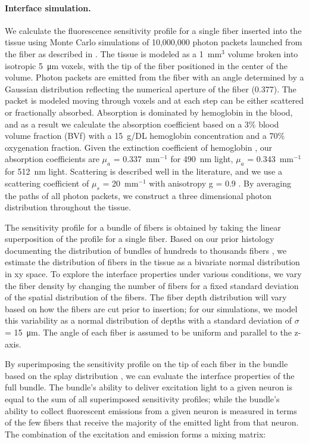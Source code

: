 \paragraph{Interface simulation.} We calculate the fluorescence sensitivity profile for a single fiber inserted into the tissue using Monte Carlo simulations of 10,000,000 photon packets launched from the fiber as described in \cite{Boas:2002ue,Perkins:2018ae}. The tissue is modeled as a 1~mm$^3$ volume broken into isotropic 5~\si{\micro\meter} voxels, with the tip of the fiber positioned in the center of the volume. Photon packets are emitted from the fiber with an angle determined by a Gaussian distribution reflecting the numerical aperture of the fiber (0.377). The packet is modeled moving through voxels and at each step can be either scattered or fractionally absorbed. Absorption is dominated by hemoglobin in the blood, and as a result we calculate the absorption coefficient based on a 3\% blood volume fraction (BVf) \cite{S:2010hi} with a 15~g/DL hemoglobin concentration \cite{Raabe:2011uo} and a 70\% oxygenation fraction. Given the extinction coefficient of hemoglobin \cite{kollias1999tabulated}, our absorption coefficients are $\mu_a$ = 0.337~mm$^{-1}$ for 490~nm light, $\mu_a$ = 0.343~mm$^{-1}$ for 512~nm light. Scattering is described well in the literature, and we use a scattering coefficient of $\mu_s$ = 20~mm$^{-1}$ with anisotropy g = 0.9 \cite{AlJuboori:2013cj,Yi:2012wp}. By averaging the paths of all photon packets, we construct a three dimensional photon distribution throughout the tissue.

The sensitivity profile for a bundle of fibers is obtained by taking the linear superposition of the profile for a single fiber. Based on our prior histology documenting the distribution of bundles of hundreds to thousands fibers \cite{Perkins:2018ae}, we estimate the distribution of fibers in the tissue as a bivariate normal distribution in xy space. To explore the interface properties under various conditions, we vary the fiber density by changing the number of fibers for a fixed standard deviation of the spatial distribution of the fibers. The fiber depth distribution will vary based on how the fibers are cut prior to insertion; for our simulations, we model this variability as a normal distribution of depths with a standard deviation of $\sigma$ = 15~\si{\micro\meter}. The angle of each fiber is assumed to be uniform and parallel to the z-axis.

By superimposing the sensitivity profile on the tip of each fiber in the bundle based on the splay distribution \cite{Hillman:2004wca,Burgess:2008uu}, we can evaluate the interface properties of the full bundle. The bundle's ability to deliver excitation light to a given neuron is equal to the sum of all superimposed sensitivity profiles; while the bundle's ability to collect fluorescent emissions from a given neuron is measured in terms of the few fibers that receive the majority of the emitted light from that neuron. The combination of the excitation and emission forms a mixing matrix:


